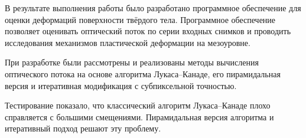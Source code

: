 \setcounter{figure}{0}

В результате выполнения работы было разработано программное обеспечение для оценки деформаций поверхности твёрдого тела. Программное обеспечение позволяет оценивать оптический поток по серии входных снимков и проводить исследования механизмов пластической деформации на мезоуровне. %

При разработке были рассмотрены и реализованы методы вычисления оптического потока на основе алгоритма Лукаса--Канаде, его пирамидальная версия и итеративная модификация с субпиксельной точностью.

Тестирование показало, что классический алгоритм Лукаса--Канаде плохо справляется с большими смещениями. Пирамидальная версия алгоритма и итеративный подход решают эту проблему. %

